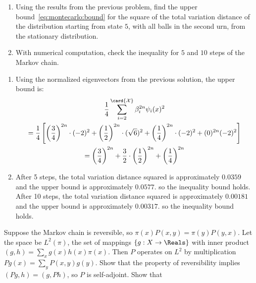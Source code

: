 \documentclass[12pt]{article}
\begin{document}
\begin{exercise}
    \begin{enumerate}[label=(\alph*)]
    \item
        Using the results from the previous problem, find the upper
        bound~\eqref{eq:montecarlo:bound} for the square of the total
        variation distance of the distribution starting from state \( 5 \),
        with all balls in the second urn, from the stationary
        distribution.
    \item
        With numerical computation, check the inequality for \( 5 \) and
        \( 10 \) steps of the Markov chain.
\end{enumerate}
\end{exercise}
\begin{solution}
    \begin{enumerate}[label=(\alph*)]
    \item
        Using the normalized eigenvectors from the previous solution,
        the upper bound is:
        \begin{multline*}
            \frac{1}{4} \sum\limits_{i=2}^{\card{\mathcal{X}}} \beta_i^{2n}
            \psi_i(x)^2 \\
            = \frac{1}{4} \left[ \left(\frac{3}{4} \right)^{2n}
            \cdot (-2)^{2} + \left( \frac{1}{2} \right)^{2n} \cdot (\sqrt
            {6})^2 + \left(\frac{1}{4} \right)^{2n} \cdot (-2)^{2} + (0)^
            {2n} (-2)^{2} \right] \\
            = \left( \frac{3}{4} \right)^{2n} + \frac{3}{2} \cdot \left(
            \frac{1}{2} \right)^{2n} + \left( \frac{1}{4} \right)^{2n}
        \end{multline*}
    \item
        After 5 steps, the total variation distance squared is
        approximately \( 0.0359 \) and the upper bound is approximately \(
        0.0577 \). so the inequality bound holds.  After 10 steps, the
        total variation distance squared is approximately \( 0.00181 \)
        and the upper bound is approximately \( 0.00317 \). so the
        inequality bound holds.
\end{enumerate}

\end{solution}
\begin{exercise}
    Suppose the Markov chain is reversible, so \( \pi(x) P(x,y) =
    \pi(y) P(y,x) \).  Let the space be \( L^2(\pi) \), the set of
    mappings \( \{g : X \to \Reals \} \) with inner product \( (g,h) =
    \sum\limits_{x}g(x) h(x) \pi(x) \).  Then \( P \) operates on \( L^2
    \) by multiplication \( Pg(x) = \sum\limits_y P(x,y) g(y) \).  Show
    that the property of reversibility implies \( (Pg,h) = (g,Ph) \), so
    \( P \) is self-adjoint. Show that
\end{exercise}
\end{document}
